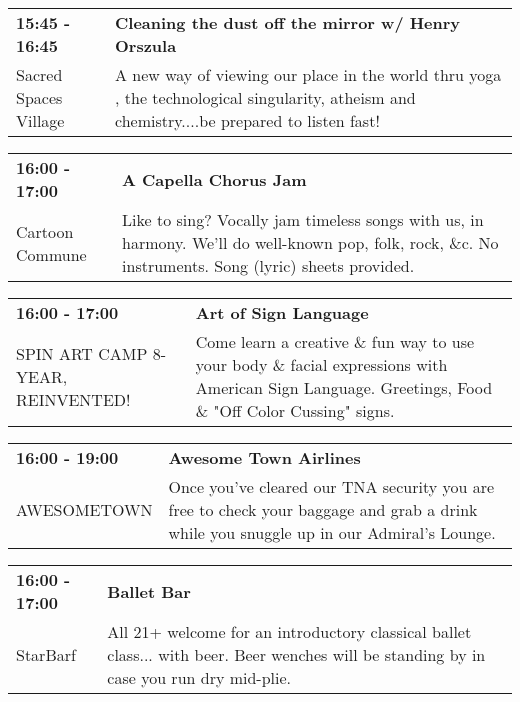 \begin{tabular}{ p{1in} p{2.2in} }
    \textbf{15:45 - 16:45} & \textbf{Cleaning the dust off the mirror w/ Henry Orszula} \\
    Sacred Spaces Village \newline  & A new way of viewing our place in the world thru yoga , the technological singularity, atheism and chemistry....be prepared to listen fast! \\
    \hline 
\end{tabular}
    
\begin{tabular}{ p{1in} p{2.2in} }
    \textbf{16:00 - 17:00} & \textbf{A Capella Chorus Jam} \\
    Cartoon Commune \newline  & Like to sing? Vocally jam timeless songs with us, in harmony. We'll do well-known pop, folk, rock, \&c. No instruments. Song (lyric) sheets provided. \\
    \hline 
\end{tabular}
    
\begin{tabular}{ p{1in} p{2.2in} }
    \textbf{16:00 - 17:00} & \textbf{Art of Sign Language} \\
    SPIN ART CAMP 8-YEAR, REINVENTED! \newline  & Come learn a creative \& fun way to use your body \& facial expressions with American Sign Language. Greetings, Food \& "Off Color Cussing" signs. \\
    \hline 
\end{tabular}
    
\begin{tabular}{ p{1in} p{2.2in} }
    \textbf{16:00 - 19:00} & \textbf{Awesome Town Airlines} \\
    AWESOMETOWN \newline  & Once you've cleared our TNA security you are free to check your baggage and grab a drink while you snuggle up in our Admiral's Lounge. \\
    \hline 
\end{tabular}
    
\begin{tabular}{ p{1in} p{2.2in} }
    \textbf{16:00 - 17:00} & \textbf{Ballet Bar} \\
    StarBarf \newline  & All 21+ welcome for an introductory classical ballet class... with beer. Beer wenches will be standing by in case you run dry mid-plie. \\
    \hline 
\end{tabular}
    
